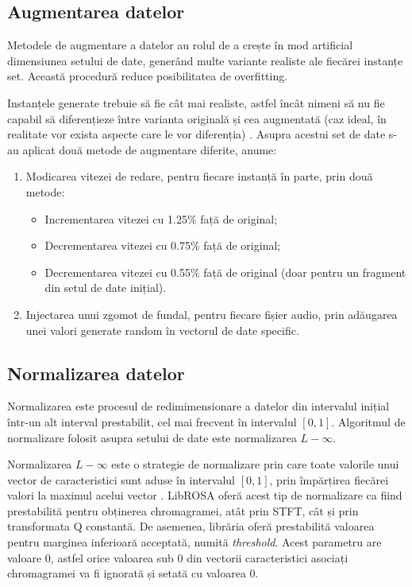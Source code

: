 \documentclass[a4paper,12pt]{report}
\begin{document}
\subsection{Augmentarea datelor}
Metodele de augmentare a datelor au rolul de a crește în mod artificial 
dimensiunea setului de date, generând multe variante realiste ale fiecărei 
instanțe set. Această procedură reduce posibilitatea de overfitting. 

Instanțele generate trebuie să fie cât mai realiste, astfel încât nimeni să nu fie 
capabil să diferențieze între varianta originală și cea augmentată (caz ideal, în realitate 
vor exista aspecte care le vor diferenția) \cite{Hands-On-Machine-Learning}.
Asupra acestui set de date s-au aplicat două metode de augmentare diferite, anume:
\begin{enumerate}
    \item Modicarea vitezei de redare, pentru fiecare instanță în parte, prin două metode:
    \begin{itemize}
        \item Incrementarea vitezei cu 1.25\% față de original;
        \item Decrementarea vitezei cu 0.75\% față de original;
        \item Decrementarea vitezei cu 0.55\% față de original (doar pentru un fragment 
        din setul de date inițial).
    \end{itemize}
    \item Injectarea unui zgomot de fundal, pentru fiecare fișier audio, prin adăugarea 
unei valori generate random în vectorul de date specific.
\end{enumerate}

\subsection{Normalizarea datelor}
Normalizarea este procesul de redimimensionare a datelor din intervalul 
inițial într-un alt interval prestabilit, cel mai frecvent în 
intervalul $[0,1]$. Algoritmul de normalizare folosit asupra 
setului de date este normalizarea $L-\infty$. 

Normalizarea $L-\infty$ este 
o strategie de normalizare prin care toate valorile unui vector de caracteristici sunt aduse 
în intervalul $[0,1]$, prin împărțirea fiecărei valori la maximul acelui vector \cite{Bonvini-Recognition}.
LibROSA oferă acest tip de normalizare ca fiind prestabilită pentru obținerea 
chromagramei, atât prin STFT, cât și prin transformata Q constantă. 
De asemenea, librăria oferă prestabilită valoarea pentru marginea inferioară 
acceptată, numită \emph{threshold}. Acest parametru are valoare 0, astfel 
orice valoarea sub 0 din vectorii caracteristici asociați chromagramei va fi ignorată
și setată cu valoarea 0.
\end{document}
